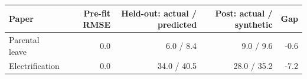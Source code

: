 \begin{tabular}{lrrrr}
\toprule
Paper & Pre-fit RMSE & Held-out: actual / predicted & Post: actual / synthetic & Gap \\
\midrule
Parental leave & 0.0 & 6.0 / 8.4 & 9.0 / 9.6 & -0.6 \\
Electrification & 0.0 & 34.0 / 40.5 & 28.0 / 35.2 & -7.2 \\
\bottomrule
\end{tabular}

